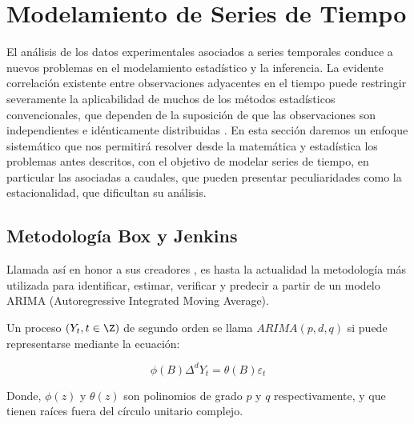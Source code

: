 \documentclass[12pt,oneside]{book}\usepackage[]{graphicx}\usepackage[]{color}
\theoremstyle{definition} %
\begin{document}

\section{Modelamiento de Series de Tiempo}

El análisis de los datos experimentales asociados a series temporales conduce a nuevos problemas en el modelamiento estadístico y la inferencia. La evidente correlación existente entre observaciones adyacentes en el tiempo puede restringir severamente la aplicabilidad de muchos de los métodos estadísticos convencionales, que dependen de la suposición de que las observaciones son independientes e idénticamente distribuidas \cite{shumway2017time}.
En esta sección daremos un enfoque sistemático que nos permitirá resolver desde la matemática y estadística los problemas antes descritos, con el objetivo de modelar series de tiempo, en particular las asociadas a caudales, que pueden presentar peculiaridades como la estacionalidad, que dificultan su análisis.
%





\subsection{Metodología Box y Jenkins}
\label{sec2box}

Llamada así en honor a sus creadores \citeauthor{box1970time}, es hasta la actualidad la metodología más utilizada para identificar, estimar, verificar y predecir a partir de un modelo ARIMA (Autoregressive Integrated Moving Average). 


\begin{definicion}
Un proceso $(Y_t, t \in \Z)$ de segundo orden se llama $ARIMA(p,d,q)$ si puede representarse mediante la ecuación:

\begin{equation}
\phi  (B) \Delta^d Y_t =  \theta  (B) \varepsilon_t\label{eq:arima_def}
\end{equation}

Donde, $\phi(z)$ y $\theta (z)$ son polinomios de grado $p$ y $q$ respectivamente, y que tienen raíces fuera del círculo unitario complejo.
\end{definicion}
\end{document}

